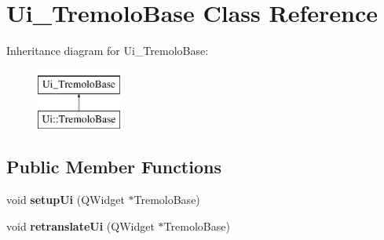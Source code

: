 \hypertarget{class_ui___tremolo_base}{}\section{Ui\+\_\+\+Tremolo\+Base Class Reference}
\label{class_ui___tremolo_base}
Inheritance diagram for Ui\+\_\+\+Tremolo\+Base\+:\begin{figure}[H]
\begin{center}
\leavevmode
\includegraphics[height=2.000000cm]{class_ui___tremolo_base}
\end{center}
\end{figure}
\subsection*{Public Member Functions}
\begin{DoxyCompactItemize}
\item 
\mbox{\label{class_ui___tremolo_base_a14bd7a793a4d15b37478a349be6ff60b}} 
void {\bfseries setup\+Ui} (Q\+Widget $\ast$Tremolo\+Base)
\item 
\mbox{\label{class_ui___tremolo_base_a13113c3b611233dc9231167a9a240ac0}} 
void {\bfseries retranslate\+Ui} (Q\+Widget $\ast$Tremolo\+Base)
\end{DoxyCompactItemize}

